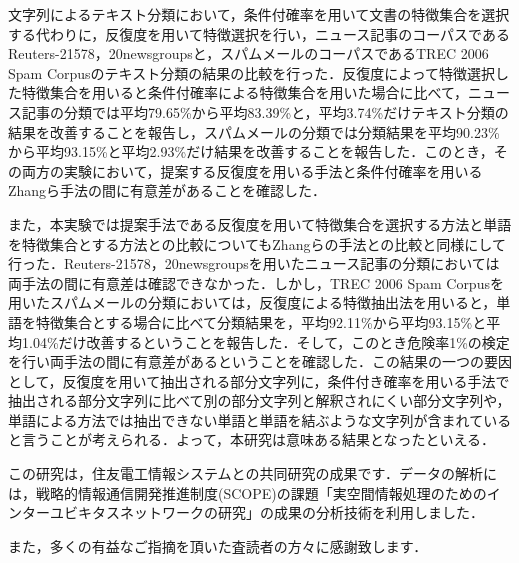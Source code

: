 \documentclass[japanese]{jnlp_1.4}
\begin{document}
文字列によるテキスト分類において，条件付確率を用いて文書の特徴集合を選択する代わりに，反復度を用いて特徴選択を行い，ニュース記事のコーパスであるReuters-21578，20newsgroupsと，スパムメールのコーパスであるTREC 
2006 Spam 
Corpusのテキスト分類の結果の比較を行った．反復度によって特徴選択した特徴集合を用いると条件付確率による特徴集合を用いた場合に比べて，ニュース記事の分類では平均79.65{\%}から平均83.39{\%}と，平均3.74{\%}だけテキスト分類の結果を改善することを報告し，スパムメールの分類では分類結果を平均90.23{\%}から平均93.15{\%}と平均2.93{\%}だけ結果を改善することを報告した．このとき，その両方の実験において，提案する反復度を用いる手法と条件付確率を用いるZhangら手法の間に有意差があることを確認した．

また，本実験では提案手法である反復度を用いて特徴集合を選択する方法と単語を特徴集合とする方法との比較についてもZhangらの手法との比較と同様にして行った．Reuters-21578，20newsgroupsを用いたニュース記事の分類においては両手法の間に有意差は確認できなかった．しかし，TREC 
2006 Spam 
Corpusを用いたスパムメールの分類においては，反復度による特徴抽出法を用いると，単語を特徴集合とする場合に比べて分類結果を，平均92.11{\%}から平均93.15{\%}と平均1.04{\%}だけ改善するということを報告した．そして，このとき危険率1{\%}の検定を行い両手法の間に有意差があるということを確認した．この結果の一つの要因として，反復度を用いて抽出される部分文字列に，条件付き確率を用いる手法で抽出される部分文字列に比べて別の部分文字列と解釈されにくい部分文字列や，単語による方法では抽出できない単語と単語を結ぶような文字列が含まれていると言うことが考えられる．よって，本研究は意味ある結果となったといえる．


\acknowledgment

この研究は，住友電工情報システムとの共同研究の成果です．データの解析には，戦略的情報通信開発推進制度(SCOPE)の課題「実空間情報処理のためのインターユビキタスネットワークの研究」の成果の分析技術を利用しました．

また，多くの有益なご指摘を頂いた査読者の方々に感謝致します．
\end{document}
